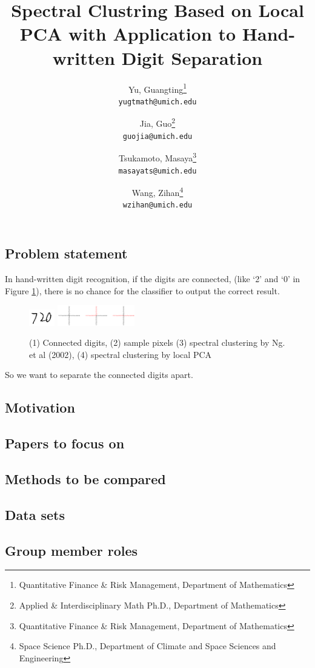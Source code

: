 \documentclass[10pt,twocolumn]{article}
\title{\large{Spectral Clustring Based on Local PCA with Application to Hand-written Digit Separation}}
\author{
    Yu, Guangting\thanks{Quantitative Finance \& Risk Management, Department of Mathematics} \\
    \small{\texttt{yugtmath@umich.edu}}
    \and
    Jia, Guo\thanks{Applied \& Interdisciplinary Math Ph.D., Department of Mathematics} \\
    \texttt{guojia@umich.edu}
    \and
    Tsukamoto, Masaya\thanks{Quantitative Finance \& Risk Management, Department of Mathematics} \\
    \texttt{masayats@umich.edu}
    \and
    Wang, Zihan\thanks{Space Science Ph.D., Department of Climate and Space Sciences and Engineering} \\
    \texttt{wzihan@umich.edu}
}
\begin{document}
\maketitle
\subsection*{Problem statement}
In hand-written digit recognition, if the digits are connected, (like `2' and `0' in Figure \ref{fig1}), there is no chance for the classifier to output the correct result.
\begin{figure}[htbp]
\centering
\includegraphics[width=0.1\textwidth]{connected-digits.png}
\hspace{1em}
\includegraphics[width=0.3\textwidth]{effect.png}
\label{fig1}
\caption{(1) Connected digits, (2) sample pixels (3) spectral clustering by Ng. et al (2002), (4) spectral clustering by local PCA}
\end{figure}
So we want to separate the connected digits apart.
\subsection*{Motivation}

\subsection*{Papers to focus on}
\subsection*{Methods to be compared}
\subsection*{Data sets}
\subsection*{Group member roles}
\end{document}
